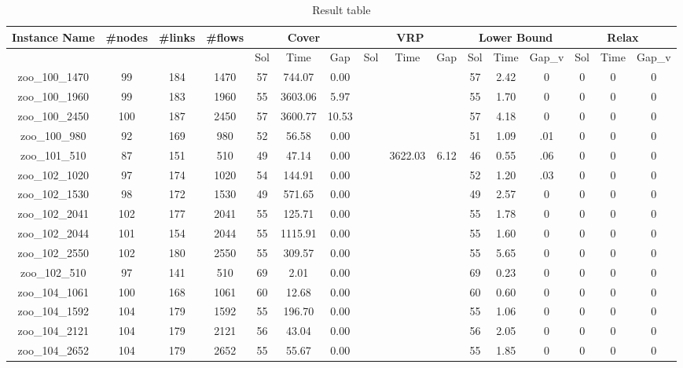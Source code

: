 \begin{landscape}
\begin{longtable}{|c|c|c|c|c|c|c|c|c|c|c|c|c|c|c|c|}
\caption{Result table}
\hline
Instance Name & \#nodes & \#links & \#flows & \multicolumn{3}{c|}{Cover} & \multicolumn{3}{c|}{VRP} & \multicolumn{3}{c|}{Lower Bound} & \multicolumn{3}{c|}{Relax} \\ \hline
& & & & Sol & Time & Gap & Sol & Time & Gap & Sol & Time & Gap_v & Sol & Time & Gap_v \\ \hline
zoo\_100\_1470 & 99 & 184 & 1470 & 57 & 744.07 & 0.00 &  &  &  & 57 & 2.42 & 0 & 0 & 0 & 0 \\ \hline 
zoo\_100\_1960 & 99 & 183 & 1960 & 55 & 3603.06 & 5.97 &  &  &  & 55 & 1.70 & 0 & 0 & 0 & 0 \\ \hline 
zoo\_100\_2450 & 100 & 187 & 2450 & 57 & 3600.77 & 10.53 &  &  &  & 57 & 4.18 & 0 & 0 & 0 & 0 \\ \hline 
zoo\_100\_980 & 92 & 169 & 980 & 52 & 56.58 & 0.00 &  &  &  & 51 & 1.09 & .01 & 0 & 0 & 0 \\ \hline 
zoo\_101\_510 & 87 & 151 & 510 & 49 & 47.14 & 0.00 &  & 3622.03 & 6.12 & 46 & 0.55 & .06 & 0 & 0 & 0 \\ \hline 
zoo\_102\_1020 & 97 & 174 & 1020 & 54 & 144.91 & 0.00 &  &  &  & 52 & 1.20 & .03 & 0 & 0 & 0 \\ \hline 
zoo\_102\_1530 & 98 & 172 & 1530 & 49 & 571.65 & 0.00 &  &  &  & 49 & 2.57 & 0 & 0 & 0 & 0 \\ \hline 
zoo\_102\_2041 & 102 & 177 & 2041 & 55 & 125.71 & 0.00 &  &  &  & 55 & 1.78 & 0 & 0 & 0 & 0 \\ \hline 
zoo\_102\_2044 & 101 & 154 & 2044 & 55 & 1115.91 & 0.00 &  &  &  & 55 & 1.60 & 0 & 0 & 0 & 0 \\ \hline 
zoo\_102\_2550 & 102 & 180 & 2550 & 55 & 309.57 & 0.00 &  &  &  & 55 & 5.65 & 0 & 0 & 0 & 0 \\ \hline 
zoo\_102\_510 & 97 & 141 & 510 & 69 & 2.01 & 0.00 &  &  &  & 69 & 0.23 & 0 & 0 & 0 & 0 \\ \hline 
zoo\_104\_1061 & 100 & 168 & 1061 & 60 & 12.68 & 0.00 &  &  &  & 60 & 0.60 & 0 & 0 & 0 & 0 \\ \hline 
zoo\_104\_1592 & 104 & 179 & 1592 & 55 & 196.70 & 0.00 &  &  &  & 55 & 1.06 & 0 & 0 & 0 & 0 \\ \hline 
zoo\_104\_2121 & 104 & 179 & 2121 & 56 & 43.04 & 0.00 &  &  &  & 56 & 2.05 & 0 & 0 & 0 & 0 \\ \hline 
zoo\_104\_2652 & 104 & 179 & 2652 & 55 & 55.67 & 0.00 &  &  &  & 55 & 1.85 & 0 & 0 & 0 & 0 \\ \hline 

\end{longtable}
\end{landscape}
